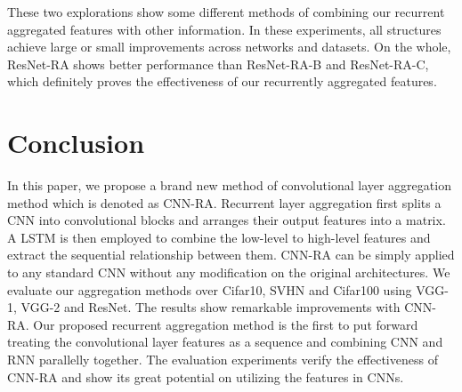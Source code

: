 \documentclass[conference]{IEEEtran}
\begin{document}
These two explorations show some different methods of combining our recurrent aggregated features with other information. In these experiments, all structures achieve large or small improvements across networks and datasets. On the whole, ResNet-RA shows better performance than ResNet-RA-B and ResNet-RA-C, which definitely proves the effectiveness of our recurrently aggregated features.

\section{Conclusion}
In this paper, we propose a brand new method of convolutional layer aggregation method which is denoted as CNN-RA. Recurrent layer aggregation first splits a CNN into convolutional blocks and arranges their output features into a matrix. A LSTM is then employed to combine the low-level to high-level features and extract the sequential relationship between them. CNN-RA can be simply applied to any standard CNN without any modification on the original architectures. We evaluate our aggregation methods over Cifar10, SVHN and Cifar100 using VGG-1, VGG-2 and ResNet. The results show remarkable improvements with CNN-RA. Our proposed recurrent aggregation method is the first to put forward treating the convolutional layer features as a sequence and combining CNN and RNN parallelly together. The evaluation experiments verify the effectiveness of CNN-RA and show its great potential on utilizing the features in CNNs.

\newpage


\vspace{12pt}
\end{document}
